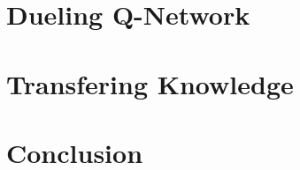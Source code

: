 \documentclass[10pt,twocolumn,letterpaper]{article}
\begin{document}
\section{Dueling Q-Network}


\section{Transfering Knowledge}


\section{Conclusion}



% 





{\small


}
\end{document}
